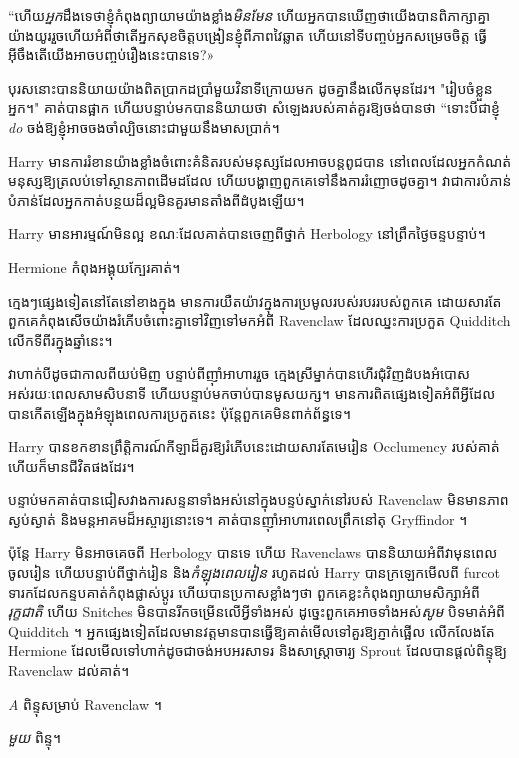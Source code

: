 {“ហើយ\emph{អ្នក}ដឹងទេថាខ្ញុំកំពុងព្យាយាមយ៉ាងខ្លាំង\emph{មិនមែន} ហើយអ្នកបានឃើញថាយើងបានពិភាក្សាគ្នាយ៉ាងយូររួចហើយអំពីថាតើអ្នកសុខចិត្តបង្រៀនខ្ញុំពីភាពវៃឆ្លាត ហើយនៅទីបញ្ចប់អ្នកសម្រេចចិត្ត ធ្វើ​អ៊ីចឹង​តើ​យើង​អាច​បញ្ចប់​រឿង​នេះ​បាន​ទេ?»

បុរសនោះបាននិយាយយ៉ាងពិតប្រាកដប្រាំមួយវិនាទីក្រោយមក ដូចគ្នានឹងលើកមុនដែរ។ "រៀបចំខ្លួនអ្នក។" គាត់​បាន​ផ្អាក ហើយ​បន្ទាប់​មក​បាន​និយាយ​ថា សំឡេង​របស់​គាត់​គួរ​ឱ្យ​ចង់​បាន​ថា “ទោះ​បី​ជា​ខ្ញុំ \emph{do} ចង់​ឱ្យ​ខ្ញុំ​អាច​ចងចាំ​ល្បិច​នោះ​ជាមួយ​នឹង​មាស​ប្រាក់​។

Harry មានការរំខានយ៉ាងខ្លាំងចំពោះគំនិតរបស់មនុស្សដែលអាចបន្តពូជបាន នៅពេលដែលអ្នកកំណត់មនុស្សឱ្យត្រលប់ទៅស្ថានភាពដើមដដែល ហើយបង្ហាញពួកគេទៅនឹងការរំញោចដូចគ្នា។ វាជាការបំភាន់បំភាន់ដែលអ្នកកាត់បន្ថយដ៏ល្អមិនគួរមានតាំងពីដំបូងឡើយ។

\later

Harry មាន​អារម្មណ៍​មិន​ល្អ ខណៈ​ដែល​គាត់​បាន​ចេញ​ពី​ថ្នាក់ Herbology នៅ​ព្រឹក​ថ្ងៃ​ចន្ទ​បន្ទាប់។

Hermione កំពុង​អង្គុយ​ក្បែរ​គាត់។

ក្មេងៗផ្សេងទៀតនៅតែនៅខាងក្នុង មានការយឺតយ៉ាវក្នុងការប្រមូលរបស់របររបស់ពួកគេ ដោយសារតែពួកគេកំពុងសើចយ៉ាងរំភើបចំពោះគ្នាទៅវិញទៅមកអំពី Ravenclaw ដែលឈ្នះការប្រកួត Quidditch លើកទីពីរក្នុងឆ្នាំនេះ។

វាហាក់បីដូចជាកាលពីយប់មិញ បន្ទាប់ពីញ៉ាំអាហាររួច ក្មេងស្រីម្នាក់បានហើរជុំវិញដំបងអំបោសអស់រយៈពេលសាមសិបនាទី ហើយបន្ទាប់មកចាប់បានមូសយក្ស។ មានការពិតផ្សេងទៀតអំពីអ្វីដែលបានកើតឡើងក្នុងអំឡុងពេលការប្រកួតនេះ ប៉ុន្តែពួកគេមិនពាក់ព័ន្ធទេ។

Harry បានខកខានព្រឹត្តិការណ៍កីឡាដ៏គួរឱ្យរំភើបនេះដោយសារតែមេរៀន Occlumency របស់គាត់ ហើយក៏មានជីវិតផងដែរ។

បន្ទាប់មកគាត់បានជៀសវាងការសន្ទនាទាំងអស់នៅក្នុងបន្ទប់ស្នាក់នៅរបស់ Ravenclaw មិនមានភាពស្ងប់ស្ងាត់ និងមន្តអាគមដ៏អស្ចារ្យនោះទេ។ គាត់បានញ៉ាំអាហារពេលព្រឹកនៅតុ Gryffindor ។

ប៉ុន្តែ Harry មិនអាចគេចពី Herbology បានទេ ហើយ Ravenclaws បាននិយាយអំពីវាមុនពេលចូលរៀន ហើយបន្ទាប់ពីថ្នាក់រៀន និង\emph{កំឡុងពេលរៀន} រហូតដល់ Harry បានក្រឡេកមើលពី furcot ទារកដែលកន្ទបគាត់កំពុងផ្លាស់ប្តូរ ហើយបានប្រកាសខ្លាំងៗថា ពួកគេខ្លះកំពុងព្យាយាមសិក្សាអំពី \emph{រុក្ខជាតិ} ហើយ Snitches មិនបានរីកចម្រើនលើអ្វីទាំងអស់ ដូច្នេះពួកគេអាចទាំងអស់\emph{សូម} បិទមាត់អំពី Quidditch ។ អ្នកផ្សេងទៀតដែលមានវត្តមានបានធ្វើឱ្យគាត់មើលទៅគួរឱ្យភ្ញាក់ផ្អើល លើកលែងតែ Hermione ដែលមើលទៅហាក់ដូចជាចង់អបអរសាទរ និងសាស្រ្តាចារ្យ Sprout ដែលបានផ្តល់ពិន្ទុឱ្យ Ravenclaw ដល់គាត់។

\emph{A} ពិន្ទុសម្រាប់ Ravenclaw ។

\emph{មួយ} ពិន្ទុ។

}
